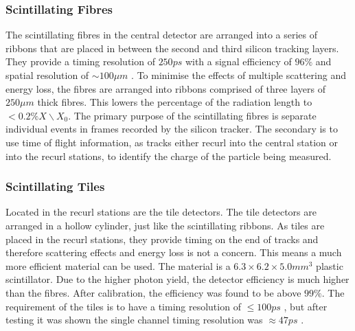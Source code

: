 \subsubsection*{Scintillating Fibres}
The scintillating fibres in the central detector are arranged into a series of ribbons that are placed in between the second and third silicon tracking layers. They provide a timing resolution of $250 ps$ with a signal efficiency of $96 \%$ and spatial resolution of $\sim 100 \mu m$ \cite{bravar2022development}. To minimise the effects of multiple scattering and energy loss, the fibres are arranged into ribbons comprised of three layers of $250 \mu m$ thick fibres. This lowers the percentage of the radiation length to $< 0.2\% X\backslash X_{0}$. The primary purpose of the scintillating fibres is separate individual events in frames recorded by the silicon tracker. The secondary is to use time of flight information, as tracks either recurl into the central station or into the recurl stations, to identify the charge of the particle being measured.

\subsubsection*{Scintillating Tiles}
Located in the recurl stations are the tile detectors. 
The tile detectors are arranged in a hollow cylinder, just like the scintillating ribbons. 
As tiles are placed in the recurl stations, they provide timing on the end of tracks and therefore scattering effects and energy loss is not a concern. 
This means a much more efficient material can be used. The material is a $6.3 \times 6.2 \times 5.0 mm^{3}$ plastic scintillator. 
Due to the higher photon yield, the detector efficiency is much higher than the fibres. After calibration, the efficiency was found to be above $99\%$. 
The requirement of the tiles is to have a timing resolution of $\leq 100ps$ \cite{Arndt}, but after testing it was shown the single channel timing resolution was $\approx 47 ps$ \cite{klingenmeyer2020measurements}.

